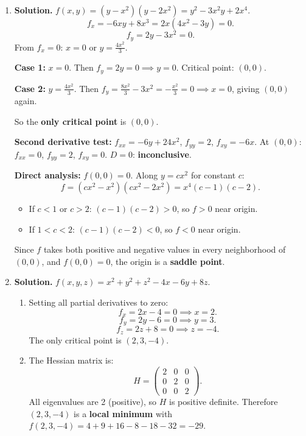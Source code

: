 \begin{enumerate}
Critical point: $(0,0)$.

$f_{xx} = -2$, $f_{yy} = -2$, $f_{xy} = 1$. $D = (-2)(-2) - 1^2 = 3 > 0$ and $f_{xx} < 0$.

$(0,0)$ is a \textbf{local maximum} with $f(0,0) = \boxed{0}$.

\item \textbf{Solution.}
$f(x,y) = (y - x^2)(y - 2x^2) = y^2 - 3x^2y + 2x^4$.
\[
f_x = -6xy + 8x^3 = 2x(4x^2 - 3y) = 0.
\]
\[
f_y = 2y - 3x^2 = 0.
\]
From $f_x = 0$: $x = 0$ or $y = \frac{4x^2}{3}$.

\textbf{Case 1:} $x = 0$. Then $f_y = 2y = 0 \implies y = 0$. Critical point: $(0,0)$.

\textbf{Case 2:} $y = \frac{4x^2}{3}$. Then $f_y = \frac{8x^2}{3} - 3x^2 = -\frac{x^2}{3} = 0 \implies x = 0$, giving $(0,0)$ again.

So the \textbf{only critical point} is $(0,0)$.

\textbf{Second derivative test:}
$f_{xx} = -6y + 24x^2$, $f_{yy} = 2$, $f_{xy} = -6x$.
At $(0,0)$: $f_{xx} = 0$, $f_{yy} = 2$, $f_{xy} = 0$. $D = 0$: \textbf{inconclusive}.

\textbf{Direct analysis:}
$f(0,0) = 0$. Along $y = cx^2$ for constant $c$:
\[
f = (cx^2 - x^2)(cx^2 - 2x^2) = x^4(c-1)(c-2).
\]
\begin{itemize}
    \item If $c < 1$ or $c > 2$: $(c-1)(c-2) > 0$, so $f > 0$ near origin.
    \item If $1 < c < 2$: $(c-1)(c-2) < 0$, so $f < 0$ near origin.
\end{itemize}

Since $f$ takes both positive and negative values in every neighborhood of $(0,0)$, and $f(0,0) = 0$, the origin is a \textbf{saddle point}.

\item \textbf{Solution.}
$f(x,y,z) = x^2 + y^2 + z^2 - 4x - 6y + 8z$.

\begin{enumerate}
    \item Setting all partial derivatives to zero:
    \[
    f_x = 2x - 4 = 0 \implies x = 2.
    \]
    \[
    f_y = 2y - 6 = 0 \implies y = 3.
    \]
    \[
    f_z = 2z + 8 = 0 \implies z = -4.
    \]
    The only critical point is $\boxed{(2, 3, -4)}$.

    \item The Hessian matrix is:
    \[
    H = \begin{pmatrix} 2 & 0 & 0 \\ 0 & 2 & 0 \\ 0 & 0 & 2 \end{pmatrix}.
    \]
    All eigenvalues are 2 (positive), so $H$ is positive definite. Therefore $(2,3,-4)$ is a \textbf{local minimum} with $f(2,3,-4) = 4 + 9 + 16 - 8 - 18 - 32 = -29$.
\end{enumerate}


\end{enumerate}
